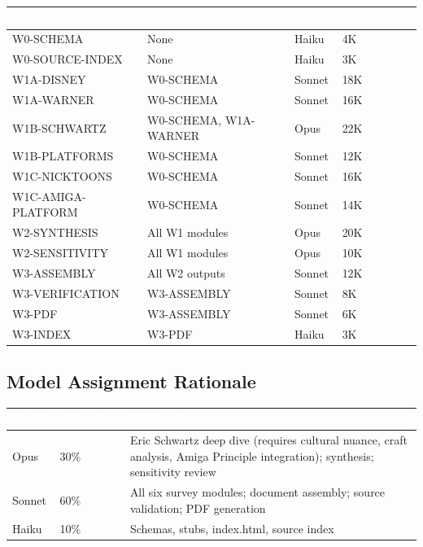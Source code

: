 \documentclass[11pt,letterpaper]{article}
\newcommand{\tableheader}[1]{\textbf{\sffamily\textcolor{white}{#1}}}
\begin{document}
\begin{center}
\begin{tabularx}{\textwidth}{L{3cm}L{2.5cm}L{1.5cm}C{1.5cm}}
\toprule
{}
\tableheader{Component} & \tableheader{Dependencies} & \tableheader{Model} & \tableheader{Est.\ Tokens} \\
\midrule
W0-SCHEMA & None & Haiku & 4K \\
W0-SOURCE-INDEX & None & Haiku & 3K \\
W1A-DISNEY & W0-SCHEMA & Sonnet & 18K \\
W1A-WARNER & W0-SCHEMA & Sonnet & 16K \\
W1B-SCHWARTZ & W0-SCHEMA, W1A-WARNER & Opus & 22K \\
W1B-PLATFORMS & W0-SCHEMA & Sonnet & 12K \\
W1C-NICKTOONS & W0-SCHEMA & Sonnet & 16K \\
W1C-AMIGA-PLATFORM & W0-SCHEMA & Sonnet & 14K \\
W2-SYNTHESIS & All W1 modules & Opus & 20K \\
W2-SENSITIVITY & All W1 modules & Opus & 10K \\
W3-ASSEMBLY & All W2 outputs & Sonnet & 12K \\
W3-VERIFICATION & W3-ASSEMBLY & Sonnet & 8K \\
W3-PDF & W3-ASSEMBLY & Sonnet & 6K \\
W3-INDEX & W3-PDF & Haiku & 3K \\
\bottomrule
\end{tabularx}
\end{center}

\subsection{Model Assignment Rationale}

\begin{center}
\begin{tabularx}{\textwidth}{L{2cm}C{1.5cm}X}
\toprule
{}
\tableheader{Model} & \tableheader{Allocation} & \tableheader{Rationale} \\
\midrule
Opus & 30\% & Eric Schwartz deep dive (requires cultural nuance, craft analysis, Amiga Principle integration); synthesis; sensitivity review \\
Sonnet & 60\% & All six survey modules; document assembly; source validation; PDF generation \\
Haiku & 10\% & Schemas, stubs, index.html, source index \\
\bottomrule
\end{tabularx}
\end{center}
\end{document}
